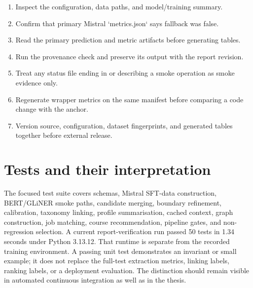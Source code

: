 \begin{enumerate}
  \item Inspect the configuration, data paths, and model/training summary.
  \item Confirm that primary Mistral `metrics.json` says fallback was false.
  \item Read the primary prediction and metric artifacts before generating tables.
  \item Run the provenance check and preserve its output with the report revision.
  \item Treat any status file ending in or describing a smoke operation as smoke evidence only.
  \item Regenerate wrapper metrics on the same manifest before comparing a code change with the anchor.
  \item Version source, configuration, dataset fingerprints, and generated tables together before external release.
\end{enumerate}

\section{Tests and their interpretation}

The focused test suite covers schemas, Mistral SFT-data construction, BERT/GLiNER smoke paths, candidate merging, boundary refinement, calibration, taxonomy linking, profile summarisation, cached context, graph construction, job matching, course recommendation, pipeline gates, and non-regression selection. A current report-verification run passed 50 tests in 1.34 seconds under Python 3.13.12. That runtime is separate from the recorded training environment. A passing unit test demonstrates an invariant or small example; it does not replace the full-test extraction metrics, linking labels, ranking labels, or a deployment evaluation. The distinction should remain visible in automated continuous integration as well as in the thesis.
